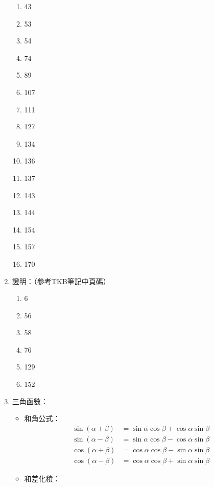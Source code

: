 \begin{enumerate}
\begin{enumerate}
        \item 43
        \item 53
        \item 54
        \item 74
        \item 89
        \item 107
        \item 111
        \item 127
        \item 134
        \item 136
        \item 137
        \item 143
        \item 144
        \item 154
        \item 157
        \item 170
    \end{enumerate}
    \item 證明：（參考TKB筆記\cite{4}中頁碼）
    \begin{enumerate}
        \item 6
        \item 56
        \item 58
        \item 76
        \item 129
        \item 152
    \end{enumerate}
    \item 三角函數：
    \begin{itemize}
        \item 和角公式： \begin{subequations}
                \begin{align}
                    \sin(\alpha + \beta) & = \sin\alpha\cos\beta + \cos\alpha\sin\beta \\
                    \sin(\alpha - \beta) & = \sin\alpha\cos\beta - \cos\alpha\sin\beta \\
                    \cos(\alpha + \beta) & = \cos\alpha\cos\beta - \sin\alpha\sin\beta \\
                    \cos(\alpha - \beta) & = \cos\alpha\cos\beta + \sin\alpha\sin\beta
                \end{align}
            \end{subequations}
        \item 和差化積： \begin{subequations}
            \begin{align}

\end{align}
\end{subequations}
\end{itemize}
\end{enumerate}
